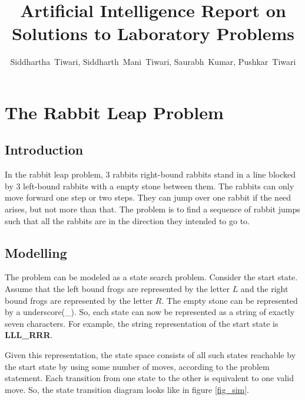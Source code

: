 \documentclass[journal, compsoc]{IEEEtran}
\title{Artificial Intelligence Report on Solutions to Laboratory Problems}
\author{Siddhartha~Tiwari, Siddharth~Mani~Tiwari, Saurabh~Kumar, Pushkar~Tiwari}
\begin{document}
\maketitle
\section{The Rabbit Leap Problem}
\subsection{Introduction}

In the rabbit leap problem, $3$ rabbits right-bound rabbits stand in a line blocked by $3$ left-bound rabbits with a empty stone between them.
The rabbits can only move forward one step or two steps. They can jump over one rabbit if the need arises, but not more than that. 
The problem is to find a sequence of rabbit jumps such that all the rabbits are in the direction they intended to go to.

\subsection{Modelling}

The problem can be modeled as a state search problem. Consider the start state. Assume that the left bound frogs are represented by
the letter $L$ and the right bound frogs are represented by the letter $R$. The empty stone can be represented by a underscore(\_).
So, each state can now be represented as a string of exactly seven characters. For example, the string representation of the start state is \textbf{LLL\_RRR}.

Given this representation, the state space consists of all such states reachable by the start state by using some number of moves,
according to the problem statement. Each transition from one state to the other is equivalent to one valid move.
So, the state transition diagram looks like in figure \ref{fig_sim}.
\end{document}
